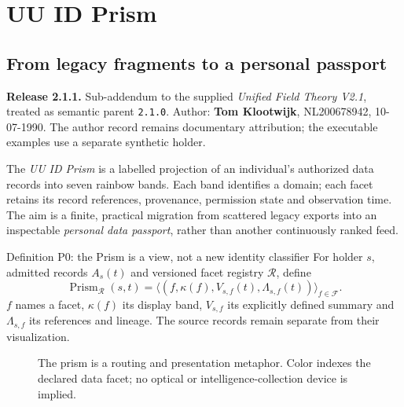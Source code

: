 \documentclass[11pt,a4paper]{article}
\begin{document}
\setcounter{page}{46}\setcounter{section}{0}\section{UU ID Prism}
\subsection{From legacy fragments to a personal passport}
\textbf{Release 2.1.1.} Sub-addendum to the supplied \emph{Unified Field Theory V2.1}, treated as semantic parent \texttt{2.1.0}. Author: \textbf{Tom Klootwijk}, NL200678942, 10-07-1990. The author record remains documentary attribution; the executable examples use a separate synthetic holder.

The \emph{UU ID Prism} is a labelled projection of an individual's authorized data records into seven rainbow bands. Each band identifies a domain; each facet retains its record references, provenance, permission state and observation time. The aim is a finite, practical migration from scattered legacy exports into an inspectable \emph{personal data passport}, rather than another continuously ranked feed.

\begin{formal}{Definition P0: the Prism is a view, not a new identity classifier}
For holder $s$, admitted records $A_s(t)$ and versioned facet registry $\mathcal R$, define
\[
\operatorname{Prism}_{\mathcal R}(s,t)
  =\big\langle (f,\kappa(f),V_{s,f}(t),\Lambda_{s,f}(t))\big\rangle_{f\in\mathcal F}.
\]
$f$ names a facet, $\kappa(f)$ its display band, $V_{s,f}$ its explicitly defined summary and $\Lambda_{s,f}$ its references and lineage. The source records remain separate from their visualization.
\end{formal}

\begin{figure}[H]\centering
{}
\caption{The prism is a routing and presentation metaphor. Color indexes the declared data facet; no optical or intelligence-collection device is implied.}
\end{figure}
\end{document}
